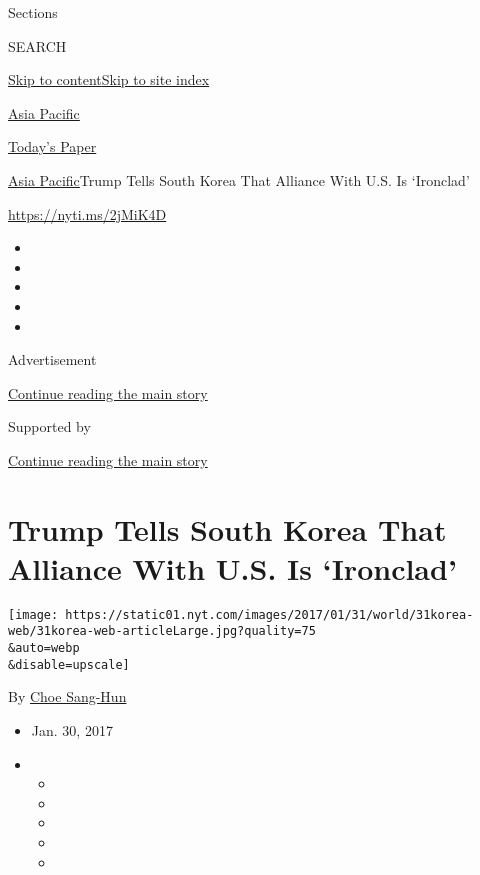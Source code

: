 Sections

SEARCH

\protect\hyperlink{site-content}{Skip to
content}\protect\hyperlink{site-index}{Skip to site index}

\href{https://www.nytimes.com/section/world/asia}{Asia Pacific}

\href{https://myaccount.nytimes.com/auth/login?response_type=cookie\&client_id=vi}{}

\href{https://www.nytimes.com/section/todayspaper}{Today's Paper}

\href{/section/world/asia}{Asia Pacific}\textbar{}Trump Tells South
Korea That Alliance With U.S. Is `Ironclad'

\url{https://nyti.ms/2jMiK4D}

\begin{itemize}
\item
\item
\item
\item
\item
\end{itemize}

Advertisement

\protect\hyperlink{after-top}{Continue reading the main story}

Supported by

\protect\hyperlink{after-sponsor}{Continue reading the main story}

\hypertarget{trump-tells-south-korea-that-alliance-with-us-is-ironclad}{%
\section{Trump Tells South Korea That Alliance With U.S. Is
`Ironclad'}\label{trump-tells-south-korea-that-alliance-with-us-is-ironclad}}

\texttt{[image: https://static01.nyt.com/images/2017/01/31/world/31korea-web/31korea-web-articleLarge.jpg?quality=75\\\&auto=webp\\\&disable=upscale]}

By \href{http://www.nytimes.com/by/choe-sang-hun}{Choe Sang-Hun}

\begin{itemize}
\item
  Jan. 30, 2017
\item
  \begin{itemize}
  \item
  \item
  \item
  \item
  \item
  \end{itemize}
\end{itemize}

